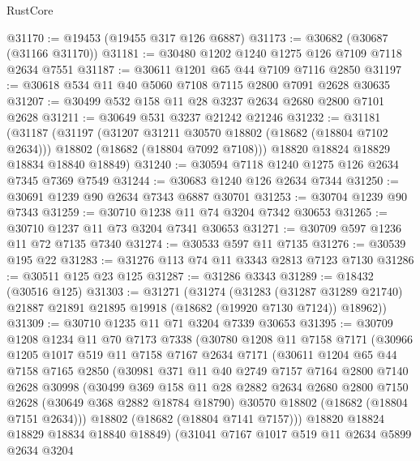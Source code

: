 \begin{lexlean}{RustCore}
\begin{coremodule}
@31170 := @19453 (@19455 @317 @126 @6887)
@31173 := @30682 (@30687 (@31166 @31170))
@31181 := @30480 @1202 @1240 @1275 @126 @7109 @7118 @2634 @7551
@31187 := @30611 @1201 @65 @44 @7109 @7116 @2850
@31197 := @30618 @534 @11 @40 @5060 @7108 @7115 @2800 @7091 @2628 @30635
@31207 := @30499 @532 @158 @11 @28 @3237 @2634 @2680 @2800 @7101 @2628
@31211 := @30649 @531 @3237 @21242 @21246
@31232 := @31181
    (@31187
      (@31197
        (@31207 @31211 @30570 @18802 (@18682 (@18804 @7102 @2634)))
        @18802
        (@18682 (@18804 @7092 @7108)))
      @18820
      @18824
      @18829
      @18834
      @18840
      @18849)
@31240 := @30594 @7118 @1240 @1275 @126 @2634 @7345 @7369 @7549
@31244 := @30683 @1240 @126 @2634 @7344
@31250 := @30691 @1239 @90 @2634 @7343 @6887 @30701
@31253 := @30704 @1239 @90 @7343
@31259 := @30710 @1238 @11 @74 @3204 @7342 @30653
@31265 := @30710 @1237 @11 @73 @3204 @7341 @30653
@31271 := @30709 @597 @1236 @11 @72 @7135 @7340
@31274 := @30533 @597 @11 @7135
@31276 := @30539 @195 @22
@31283 := @31276 @113 @74 @11 @3343 @2813 @7123 @7130
@31286 := @30511 @125 @23 @125
@31287 := @31286 @3343
@31289 := @18432 (@30516 @125)
@31303 := @31271
    (@31274
      (@31283
        (@31287 @31289 @21740)
        @21887
        @21891
        @21895
        @19918
        (@18682 (@19920 @7130 @7124))
        @18962))
@31309 := @30710 @1235 @11 @71 @3204 @7339 @30653
@31395 := @30709
    @1208
    @1234
    @11
    @70
    @7173
    @7338
    (@30780
      @1208
      @11
      @7158
      @7171
      (@30966
        @1205
        @1017
        @519
        @11
        @7158
        @7167
        @2634
        @7171
        (@30611
          @1204
          @65
          @44
          @7158
          @7165
          @2850
          (@30981
            @371
            @11
            @40
            @2749
            @7157
            @7164
            @2800
            @7140
            @2628
            @30998
            (@30499
              @369
              @158
              @11
              @28
              @2882
              @2634
              @2680
              @2800
              @7150
              @2628
              (@30649 @368 @2882 @18784 @18790)
              @30570
              @18802
              (@18682 (@18804 @7151 @2634)))
            @18802
            (@18682 (@18804 @7141 @7157)))
          @18820
          @18824
          @18829
          @18834
          @18840
          @18849)
        (@31041
          @7167
          @1017
          @519
          @11
          @2634
          @5899
          @2634
          @3204

\end{coremodule}
\end{lexlean}
